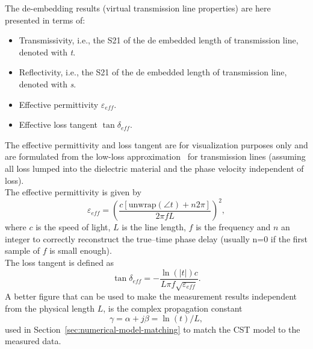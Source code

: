 \documentclass[11pt,a4paper]{article}
\newcommand{\sref}[1]{Section~\ref{#1}}
\begin{document}
    The de-embedding results (virtual transmission line properties) are here presented in terms of:
    \begin{itemize}
        \item Transmissivity, i.e., the S21 of the de embedded length of transmission line, denoted with \emph{t}.
        \item Reflectivity, i.e., the S21 of the de embedded length of transmission line, denoted with \emph{s}.
        \item Effective permittivity $\varepsilon_{eff}$.
        \item Effective loss tangent $\tan\delta_{eff}$.
    \end{itemize}
    The effective permittivity and loss tangent are for visualization purposes only and are formulated from the low-loss
    approximation~\cite{Pozar} for transmission lines (assuming all loss lumped into the dielectric material and
    the phase velocity independent of loss).\\
    The effective permittivity is given by
    \begin{equation}
        \varepsilon_{eff} = \left(\dfrac{ c [\text{unwrap}(\angle{t}) + n2\pi]} {2\pi f L}\right)^2,
        \label{eq:epsilon}
    \end{equation}
    where $c$ is the speed of light, $L$ is the line length, $f$ is the frequency and $n$ an integer to correctly reconstruct
    the true--time phase delay (usually n=0 if the first sample of $f$ is small enough).\\
    The loss tangent is defined as
    \begin{equation}
        \tan \delta_{eff} = -\dfrac{\ln(|t|) c}{L \pi f \sqrt{\varepsilon_{eff}}}.
        \label{eq:tand}
    \end{equation}
    A better figure that can be used to make the measurement results independent from the physical length $L$, is the
    complex propagation constant
    \begin{equation}
        \gamma = \alpha + j \beta = \ln(t) / L,
        \label{eq:gamma}
    \end{equation}
    used in \sref{sec:numerical-model-matching} to match the CST model to the measured data.\\
\end{document}
